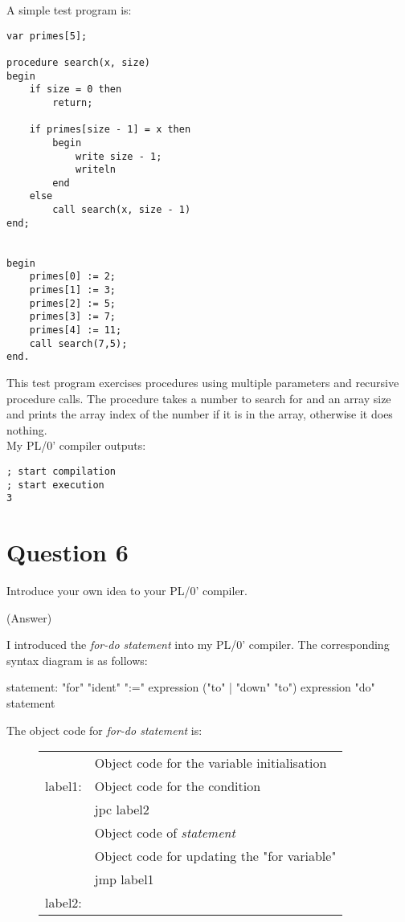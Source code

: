 \documentclass{article}
\begin{document}
A simple test program is:

\begin{verbatim}
var primes[5];

procedure search(x, size)
begin
    if size = 0 then
        return;

    if primes[size - 1] = x then
        begin
            write size - 1;
            writeln
        end
    else
        call search(x, size - 1)
end;


begin
    primes[0] := 2;
    primes[1] := 3;
    primes[2] := 5;
    primes[3] := 7;
    primes[4] := 11;
    call search(7,5);
end.
\end{verbatim}

This test program exercises procedures using multiple parameters and recursive
procedure calls. The procedure takes a number to search for and an array size
and prints the array index of the number if it is in the array, otherwise it
does nothing.\\

My PL/0' compiler outputs:
\begin{verbatim}
; start compilation
; start execution
3
\end{verbatim}

\newpage
\section*{Question 6}
Introduce your own idea to your PL/0' compiler.

\ifreport
(Answer)\\
\fi

I introduced the \emph{for-do statement} into my PL/0' compiler. The
corresponding syntax diagram is as follows:

\begin{rail}
    statement: "for" "ident" ":=" expression ("to" | "down" "to") expression
               "do" statement
\end{rail}

The object code for \emph{for-do statement} is:\\

\begin{figure}[h]
\begin{tabular}{ll}
        & Object code for the variable initialisation \\
label1: & Object code for the condition \\
        & jpc label2 \\
        & Object code of {\it statement} \\
        & Object code for updating the "for variable" \\
        & jmp label1 \\
label2:
\end{tabular}
\end{figure}
\end{document}
